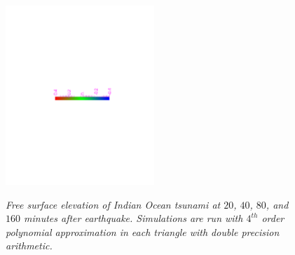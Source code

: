 \begin{figure}
\begin{center}
{\begin{minipage}[c]{0.45\linewidth}
  \end{minipage}}\\
  \centering
   \includegraphics[trim=6cm 11cm 5cm 10.5cm,clip=true,width=0.5\textwidth]{./figures/TsunamiLegend.pdf}
\end{center}
 \caption{\emph{Free surface elevation of Indian Ocean tsunami at $20$, $40$,
$80$, and $160$ minutes after earthquake. Simulations are run with $4^{th}$
order polynomial approximation in each triangle with double precision arithmetic.}}
  \label{fig:tsunami_propagation}
\end{figure}

